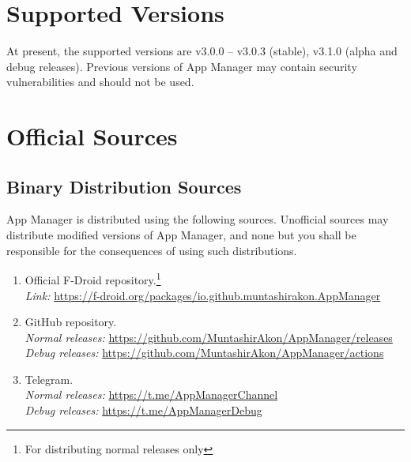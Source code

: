 \section{Supported Versions}\label{sec:supported-versions} %
At present, the supported versions are v3.0.0 -- v3.0.3 (stable), v3.1.0 (alpha and debug releases). Previous versions of App
Manager may contain security vulnerabilities and should not be used.


\section{Official Sources}\label{sec:official-sources} %

\subsection{Binary Distribution Sources}\label{subsec:binary-distribution-sources} %
App Manager is distributed using the following sources. Unofficial sources may distribute modified versions of App
Manager, and none but you shall be responsible for the consequences of using such distributions.
\begin{enumerate}
    \item Official F-Droid repository.\footnote{For distributing normal releases only}\\
    \textit{Link:} \url{https://f-droid.org/packages/io.github.muntashirakon.AppManager}
    \item GitHub repository.\\
    \textit{Normal releases:} \url{https://github.com/MuntashirAkon/AppManager/releases}\\
    \textit{Debug releases:} \url{https://github.com/MuntashirAkon/AppManager/actions}
    \item Telegram.\\
    \textit{Normal releases:} \url{https://t.me/AppManagerChannel}\\
    \textit{Debug releases:} \url{https://t.me/AppManagerDebug}
\end{enumerate}

